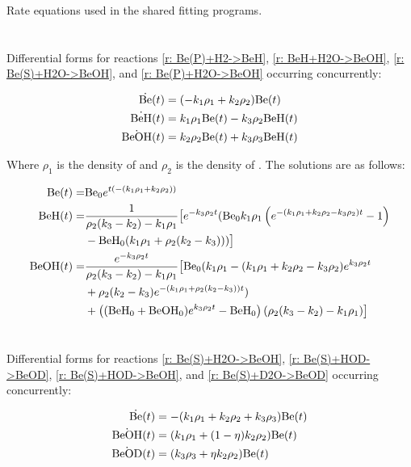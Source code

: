 Rate equations used in the shared fitting programs.

\section{} \label{sec: Be+H2O+H2 eqs}

Differential forms for reactions \ref{r: Be(P)+H2->BeH}, \ref{r: BeH+H2O->BeOH}, \ref{r: Be(S)+H2O->BeOH}, and \ref{r: Be(P)+H2O->BeOH} occurring concurrently:

\begin{align}
	\dot{\ce{Be}}(t) & = (-k_1 \rho_1 + k_2 \rho_2) \ce{Be}(t) \\
	\dot{\ce{BeH}}(t) & = k_1 \rho_1 \ce{Be}(t) - k_3 \rho_2 \ce{BeH}(t) \\
	\dot{\ce{BeOH}}(t) & = k_2 \rho_2 \ce{Be}(t) + k_3 \rho_3 \ce{BeH}(t)
\end{align}

Where $\rho_1$ is the density of  and $\rho_2$ is the density of . The solutions are as follows:

\begin{align}
	\ce{Be}(t) = & \ce{Be0} e^{t (-(k_1 \rho_1+k_2 \rho_2))} \\
	\ce{BeH}(t) = & \frac{1}{\rho_2 (k_3-k_2)-k_1 \rho_1} \big[e^{-k_3 \rho_2 t} (\ce{Be0} k_1 \rho_1 \left(e^{-(k_1 \rho_1+k_2 \rho_2-k_3 \rho_2)t}-1\right) \\
	& -\ce{BeH0} (k_1 \rho_1+\rho_2 (k_2-k_3)))\big] \\
	\ce{BeOH}(t) = & \frac{e^{-k_3 \rho_2 t}}{\rho_2 (k_3-k_2)-k_1 \rho_1} \big[\ce{Be0} (k_1 \rho_1 - (k_1 \rho_1+k_2 \rho_2-k_3 \rho_2) e^{k_3 \rho_2 t} \\
	& +\rho_2 (k_2-k_3) e^{-(k_1 \rho_1+\rho_2 (k_2-k_3))t}) \\
	& +\left((\ce{BeH0}+\ce{BeOH0}) e^{k_3 \rho_2 t}-\ce{BeH0}\right) (\rho_2 (k_3-k_2)-k_1 \rho_1)\big]
\end{align}

\section{} \label{sec: Be+HOD eqs}

Differential forms for reactions \ref{r: Be(S)+H2O->BeOH}, \ref{r: Be(S)+HOD->BeOD}, \ref{r: Be(S)+HOD->BeOH}, and \ref{r: Be(S)+D2O->BeOD} occurring concurrently:

\begin{align}
	\dot{\ce{Be}}(t) & = -(k_1\rho_1+k_2\rho_2+k_3\rho_3)\ce{Be}(t)\\
	\dot{\ce{BeOH}}(t) & = (k_1\rho_1+(1-\eta)k_2\rho_2)\ce{Be}(t)\\
	\dot{\ce{BeOD}}(t) & = (k_3\rho_3+\eta k_2\rho_2)\ce{Be}(t)
\end{align}

